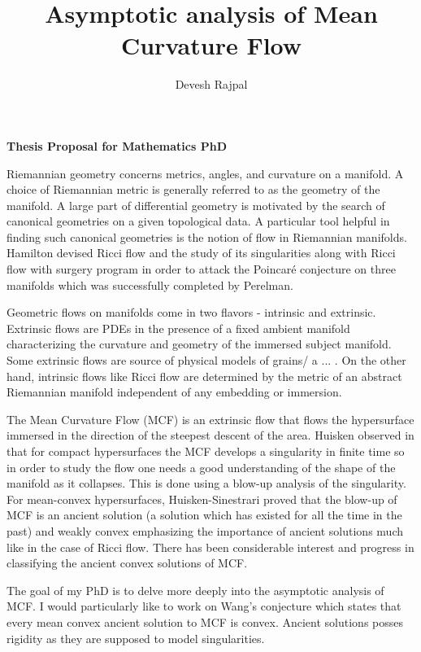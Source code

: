 \documentclass[11pt]{article}
\title{Asymptotic analysis of Mean Curvature Flow}
\author{Devesh Rajpal}
\date{}
\begin{document}
\maketitle
\begin{center}
   \textbf{Thesis Proposal for Mathematics PhD} 
\end{center}


Riemannian geometry concerns metrics, angles, and curvature on a manifold. A choice of Riemannian metric is generally referred to as the geometry of the manifold. A large part of differential geometry is motivated by the search of canonical geometries on a given topological data. A particular tool helpful in finding such canonical geometries is the notion of flow in Riemannian manifolds. %
Hamilton devised Ricci flow and the study of its singularities along with Ricci flow with surgery program in order to attack the Poincar\'{e} conjecture on three manifolds which was successfully completed by Perelman. 

Geometric flows on manifolds come in two flavors - intrinsic and extrinsic. Extrinsic flows are PDEs in the presence of a fixed ambient manifold characterizing the curvature and geometry of the immersed subject manifold. Some extrinsic flows are source of physical models of grains/ a ... . On the other hand, intrinsic flows like Ricci flow are determined by the metric of an abstract Riemannian manifold independent of any embedding or immersion. 

The Mean Curvature Flow (MCF) is an extrinsic flow that flows the hypersurface immersed %
in the direction of the steepest descent of the area. Huisken observed in \cite{huisken1984flow} that for compact hypersurfaces the MCF develops a singularity in finite time so in order to study the flow one needs a good understanding of the shape of the manifold as it collapses. This is done using a blow-up analysis of the singularity. For mean-convex hypersurfaces, Huisken-Sinestrari proved that the blow-up of MCF is an ancient solution (a solution which has existed for all the time in the past) and weakly convex emphasizing the importance of ancient solutions much like in the case of Ricci flow. There has been considerable interest and progress in classifying the ancient convex solutions of MCF. 

The goal of my PhD is to delve more deeply into the asymptotic analysis of MCF. I would particularly like to work on Wang's conjecture which states that every mean convex ancient solution to MCF is convex.  %
Ancient solutions posses rigidity as they are supposed to model singularities.

\newpage

\nocite{*}
\end{document}
